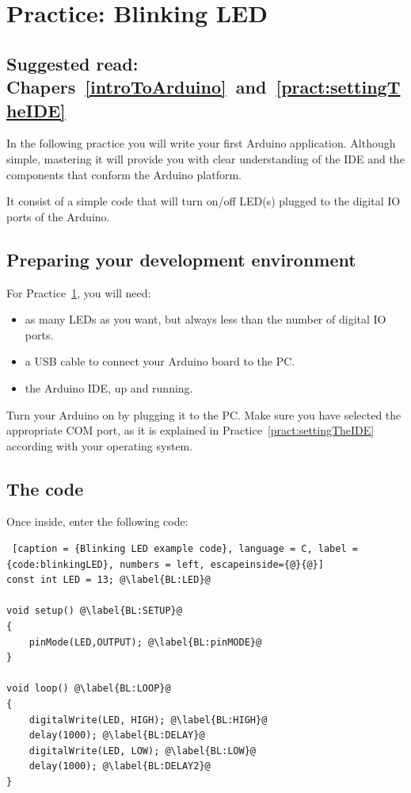 \chapter{Practice: Blinking LED}\label{pract:blinkingLED}
\section*{Suggested read: Chapers~\ref{introToArduino}~and~\ref{pract:settingTheIDE}}

In the following practice you will write your first Arduino application. Although simple, mastering it will provide you with clear understanding of the IDE and the components that conform the Arduino platform.

It consist of a simple code that will turn on/off LED(s) plugged to the digital IO ports of the Arduino.

\section{Preparing your development environment}
For Practice~\ref{pract:blinkingLED}, you will need:
\begin{itemize}
 \item as many LEDs as you want, but always less than the number of digital IO ports.
 \item a USB cable to connect your Arduino board to the PC.
 \item the Arduino IDE, up and running.
\end{itemize}

Turn your Arduino on by plugging it to the PC. Make sure you have selected the appropriate COM port, as it is explained in Practice~\ref{pract:settingTheIDE} according with your operating system.

\section{The code} 
Once inside, enter the following code:

\begin{lstlisting} [caption = {Blinking LED example code}, language = C, label = {code:blinkingLED}, numbers = left, escapeinside={@}{@}]
const int LED = 13; @\label{BL:LED}@

void setup() @\label{BL:SETUP}@
{
	pinMode(LED,OUTPUT); @\label{BL:pinMODE}@
}

void loop() @\label{BL:LOOP}@
{
	digitalWrite(LED, HIGH); @\label{BL:HIGH}@
	delay(1000); @\label{BL:DELAY}@
	digitalWrite(LED, LOW); @\label{BL:LOW}@
	delay(1000); @\label{BL:DELAY2}@
}
\end{lstlisting}

